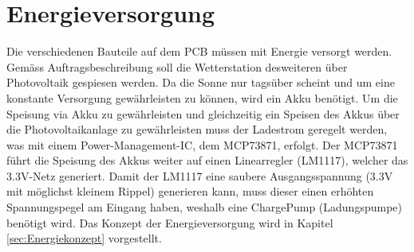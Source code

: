 \chapter{Energieversorgung}
\label{chap:Energieversorgung}
Die verschiedenen Bauteile auf dem PCB müssen mit Energie versorgt werden. Gemäss Auftragsbeschreibung soll die Wetterstation desweiteren über Photovoltaik gespiesen werden. Da die Sonne nur tagsüber scheint und um eine konstante Versorgung gewährleisten zu können, wird ein Akku benötigt. Um die Speisung via Akku zu gewährleisten und gleichzeitig ein Speisen des Akkus über die Photovoltaikanlage zu gewährleisten muss der Ladestrom geregelt werden, was mit einem Power-Management-IC, dem MCP73871, erfolgt. Der MCP73871 führt die Speisung des Akkus weiter auf einen Linearregler (LM1117), welcher das 3.3V-Netz generiert. Damit der LM1117 eine saubere Ausgangsspannung (3.3V mit möglichst kleinem Rippel) generieren kann, muss dieser einen erhöhten Spannungspegel am Eingang haben, weshalb eine ChargePump (Ladungspumpe) benötigt wird. Das Konzept der Energieversorgung wird in Kapitel \ref{sec:Energiekonzept} vorgestellt.
